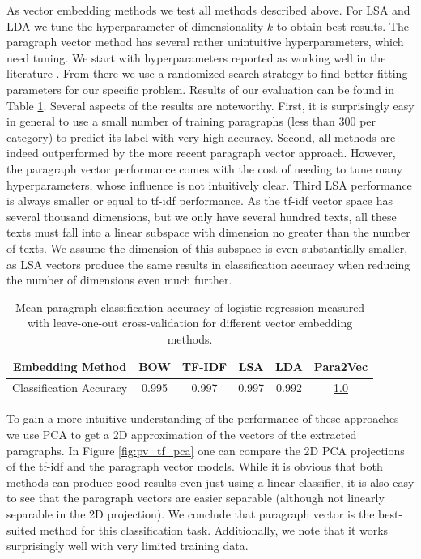 As vector embedding methods we test all methods described above. For LSA and LDA we tune the hyperparameter of dimensionality $k$ to obtain best results. The paragraph vector method has several rather unintuitive hyperparameters, which need tuning. We start with hyperparameters reported as working well in the literature \citep{Lau2016}. From there we use a randomized search strategy to find better fitting parameters for our specific problem. Results of our evaluation can be found in Table \ref{table:para_class_acc}. Several aspects of the results are noteworthy. First, it is surprisingly easy in general to use a small number of training paragraphs (less than 300 per category) to predict its label with very high accuracy. Second, all methods are indeed outperformed by the more recent paragraph vector approach. However, the paragraph vector performance comes with the cost of needing to tune many hyperparameters, whose influence is not intuitively clear. Third LSA performance is always smaller or equal to tf-idf performance. As the tf-idf vector space has several thousand dimensions, but we only have several hundred texts, all these texts must fall into a linear subspace with dimension no greater than the number of texts. We assume the dimension of this subspace is even substantially smaller, as LSA vectors produce the same results in classification accuracy when reducing the number of dimensions even much further.
\begin{table}[h]
	\begin{tabular}{|c||c|c|c|c|c|}
		\hline 
		Embedding Method & BOW & TF-IDF & LSA & LDA  & Para2Vec\tabularnewline
		\hline 
		\hline 
		Classification Accuracy & 0.995 & 0.997 & 0.997 & 0.992 & \underline{1.0}\tabularnewline
		\hline 
	\end{tabular}
	\caption{Mean paragraph classification accuracy of logistic regression measured with leave-one-out cross-validation for different vector embedding methods.}
	\label{table:para_class_acc}
\end{table}

To gain a more intuitive understanding of the performance of these approaches we use PCA to get a 2D approximation of the vectors of the extracted paragraphs. In Figure \ref{fig:pv_tf_pca} one can compare the 2D PCA projections of the tf-idf and the paragraph vector models. While it is obvious that both methods can produce good results even just using a linear classifier, it is also easy to see that the paragraph vectors are easier separable (although not linearly separable in the 2D projection). We conclude that paragraph vector is the best-suited method for this classification task. Additionally, we note that it works surprisingly well with very limited training data.


